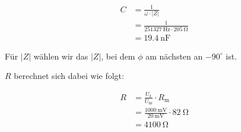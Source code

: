         \begin{equation}
            \begin{aligned}
                C &= \frac{1}{\omega \cdot |Z|}\\
                  &= \frac{1}{251327\ \mathrm{Hz} \cdot 205\ \mathrm{\Omega}}\\
                  &= 19.4\ \mathrm{nF}
                \label{eq:Versuch3_Kapazität}
            \end{aligned}
        \end{equation}

        Für $|Z|$ wählen wir das $|Z|$, bei dem $\phi$ am nächsten an $-90^{\circ}$ ist.
        
        $R$ berechnet sich dabei wie folgt:

        \begin{equation}
            \begin{aligned}
                R &= \frac{U_{\mathrm{z}}}{U_{\mathrm{m}}} \cdot R_{\mathrm{m}}\\
                    &= \frac{1000\ \mathrm{mV}}{20\ \mathrm{mV}} \cdot 82\ \mathrm{\Omega}\\
                    &= 4100\ \mathrm{\Omega}
            \end{aligned}
            \label{eq:Versuch3_Z}
        \end{equation}

